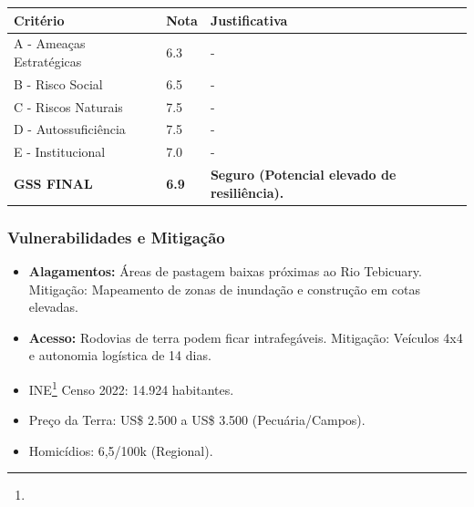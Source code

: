 \begin{table}[ht!]
\small \begin{tabular}{p{3.0cm}p{0.8cm}p{6.0cm}} \toprule
\textbf{Critério} & \textbf{Nota} & \textbf{Justificativa} \\ \midrule
A - Ameaças Estratégicas & 6.3 & - \\
B - Risco Social & 6.5 & - \\
C - Riscos Naturais & 7.5 & - \\
D - Autossuficiência & 7.5 & - \\
E - Institucional & 7.0 & - \\
\midrule \textbf{GSS FINAL} & \textbf{6.9} & \textbf{Seguro (Potencial elevado de resiliência).} \\ \bottomrule \end{tabular}
\end{table}
\subsubsection{Vulnerabilidades e
Mitigação}

\begin{itemize}
\item
  \textbf{Alagamentos:} Áreas de pastagem baixas próximas ao Rio
  Tebicuary. Mitigação: Mapeamento de zonas de inundação e construção em
  cotas elevadas.
\item
  \textbf{Acesso:} Rodovias de terra podem ficar intrafegáveis.
  Mitigação: Veículos 4x4 e autonomia logística de 14 dias.
\item
  INE\footnote{\fineINE} Censo 2022: 14.924 habitantes.
\item
  Preço da Terra: US\$ 2.500 a US\$ 3.500 (Pecuária/\allowbreak Campos).
\item
  Homicídios: 6,5/\allowbreak 100k (Regional).
\end{itemize}
